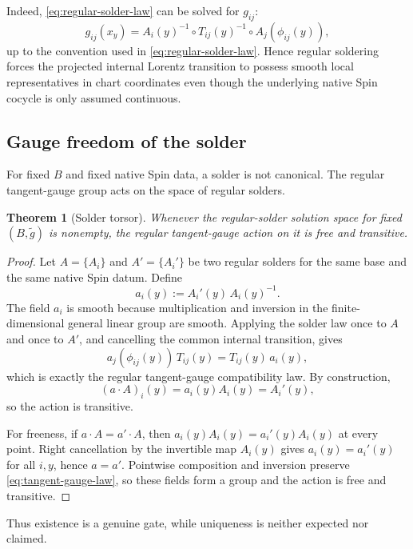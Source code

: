 \documentclass[11pt,a4paper]{article}
\newtheorem{theorem}{Theorem}[section]
\theoremstyle{definition}
\theoremstyle{remark}
\begin{document}
Indeed, \eqref{eq:regular-solder-law} can be solved for \(g_{ij}\):
\[
   g_{ij}(x_y)
   =
   A_i(y)^{-1}\circ T_{ij}(y)^{-1}
   \circ A_j(\phi_{ij}(y)),
\tag{7.5}
\]
up to the convention used in \eqref{eq:regular-solder-law}.  Hence regular soldering forces
the projected internal Lorentz transition to possess smooth local
representatives in chart coordinates even though the underlying native
Spin cocycle is only assumed continuous.

\subsection{Gauge freedom of the solder}

For fixed \(B\) and fixed native Spin data, a solder is not canonical.
The regular tangent-gauge group acts on the space of regular solders.

\begin{theorem}[Solder torsor]
\label{thm:solder-torsor}
Whenever the regular-solder solution space for fixed \((B,\widetilde g)\)
is nonempty, the regular tangent-gauge action on it is free and transitive.
\end{theorem}

\begin{proof}
Let \(A=\{A_i\}\) and \(A'=\{A_i'\}\) be two regular solders for the same
base and the same native Spin datum.  Define
\[
   a_i(y):=A_i'(y)\,A_i(y)^{-1}.
\tag{7.6}\label{eq:gauge-between-solders}
\]
The field \(a_i\) is smooth because multiplication and inversion in the
finite-dimensional general linear group are smooth.  Applying the solder
law once to \(A\) and once to \(A'\), and cancelling the common internal
transition, gives
\[
   a_j(\phi_{ij}(y))\,T_{ij}(y)
   =T_{ij}(y)\,a_i(y),
\tag{7.7}\label{eq:tangent-gauge-law}
\]
which is exactly the regular tangent-gauge compatibility law.  By
construction,
\[
   (a\cdot A)_i(y)=a_i(y)A_i(y)=A_i'(y),
\]
so the action is transitive.

For freeness, if \(a\cdot A=a'\cdot A\), then
\(a_i(y)A_i(y)=a_i'(y)A_i(y)\) at every point.  Right cancellation by the
invertible map \(A_i(y)\) gives \(a_i(y)=a_i'(y)\) for all \(i,y\), hence
\(a=a'\).  Pointwise composition and inversion preserve
\eqref{eq:tangent-gauge-law}, so these fields form a group and the action
is free and transitive.
\end{proof}

Thus existence is a genuine gate, while uniqueness is neither expected nor
claimed.

\clearpage
\end{document}
